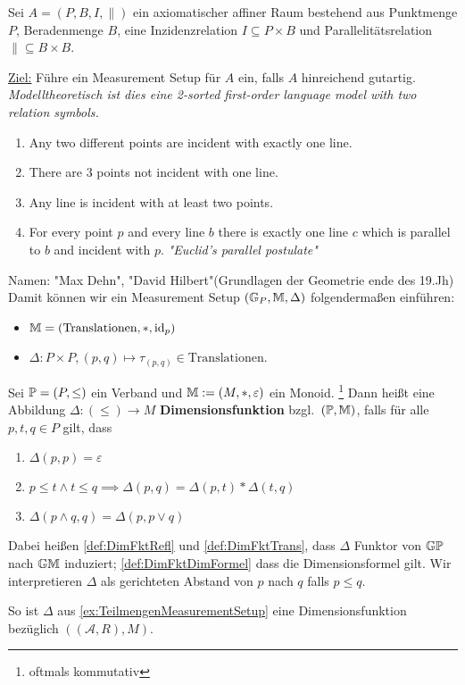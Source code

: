 \begin{beispiel}
    Sei $A = (P,B,I, \parallel)$ ein axiomatischer affiner Raum bestehend aus Punktmenge $P$, Beradenmenge $B$, eine
    Inzidenzrelation $I \subseteq P\times B$ und Parallelitätsrelation ${}\parallel{} \subseteq B \times B$.

    \underline{Ziel:} Führe ein Measurement Setup für $A$ ein, falls $A$ hinreichend gutartig.
    \textit{Modelltheoretisch ist dies eine 2-sorted first-order language model with two relation symbols.}

    \begin{enumerate}[label=(Axiom \arabic{*})]
        \item Any two different points are incident with exactly one line.
        \item There are 3 points not incident with one line.
        \item Any line is incident with at least two points.
        \item For every point $p$ and every line $b$ there is exactly one line $c$ which is parallel to $b$ and incident with $p$.
        \textit{"Euclid's parallel postulate"}
    \end{enumerate}

    Namen: "Max Dehn", "David Hilbert"(Grundlagen der Geometrie ende des 19.Jh)\nl
    Damit können wir ein Measurement Setup $(\G_P, \M, \Delta)$ folgendermaßen einführen:
    \begin{itemize}
        \item $\M = (\text{Translationen}, \ast, \id_p)$
        \item $\Delta: P\times P, (p,q) \mapsto \tau_{(p,q)} \in \text{Translationen}$.
    \end{itemize}
\end{beispiel}

\begin{definition}[Dimensionsfunktion]
    Sei $\P = (P, \leq)$ ein Verband und $\M := (M, *, \varepsilon)$ ein Monoid.%
    \footnote{oftmals kommutativ}
    Dann heißt eine Abbildung $\Delta\colon (\leq) \to M$ \textbf{Dimensionsfunktion} bzgl.~$(\P, \M)$, falls für alle $p, t, q\in P$ gilt, dass
    \begin{enumerate}[label=(\arabic*)]
        \item $\Delta(p, p) = \varepsilon$
            \label{def:DimFktRefl}
        \item $p\leq t \land t\leq q \implies \Delta(p, q) = \Delta(p, t) * \Delta(t, q)$
            \label{def:DimFktTrans}
        \item $\Delta(p\land q, q) = \Delta(p, p\lor q)$
            \label{def:DimFktDimFormel}
    \end{enumerate}
    Dabei heißen \ref{def:DimFktRefl} und \ref{def:DimFktTrans}, dass $\Delta$ Funktor von $\G\P$ nach $\G\M$ induziert;
    \ref{def:DimFktDimFormel} dass die Dimensionsformel gilt.
    Wir interpretieren $\Delta$ als gerichteten Abstand von $p$ nach $q$ falls $p\leq q$.
\end{definition}
So ist $\Delta$ aus \autoref{ex:TeilmengenMeasurementSetup} eine Dimensionsfunktion bezüglich $((\mathcal{A}, R), M)$.

